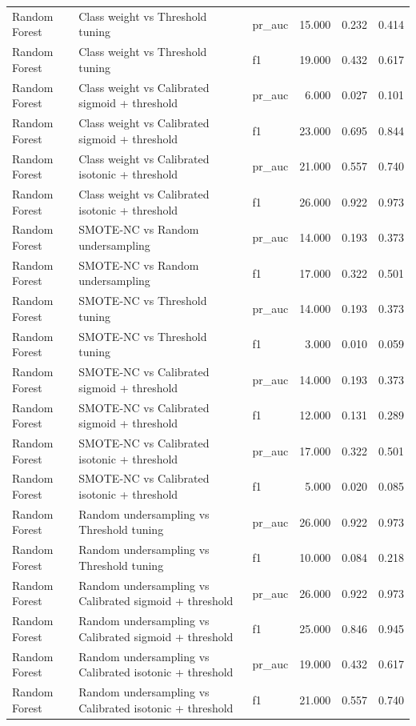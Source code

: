 \begin{tabular}{lllrrr}
Random Forest & Class weight vs Threshold tuning & pr_auc & 15.000 & 0.232 & 0.414 \\
Random Forest & Class weight vs Threshold tuning & f1 & 19.000 & 0.432 & 0.617 \\
Random Forest & Class weight vs Calibrated sigmoid + threshold & pr_auc & 6.000 & 0.027 & 0.101 \\
Random Forest & Class weight vs Calibrated sigmoid + threshold & f1 & 23.000 & 0.695 & 0.844 \\
Random Forest & Class weight vs Calibrated isotonic + threshold & pr_auc & 21.000 & 0.557 & 0.740 \\
Random Forest & Class weight vs Calibrated isotonic + threshold & f1 & 26.000 & 0.922 & 0.973 \\
Random Forest & SMOTE-NC vs Random undersampling & pr_auc & 14.000 & 0.193 & 0.373 \\
Random Forest & SMOTE-NC vs Random undersampling & f1 & 17.000 & 0.322 & 0.501 \\
Random Forest & SMOTE-NC vs Threshold tuning & pr_auc & 14.000 & 0.193 & 0.373 \\
Random Forest & SMOTE-NC vs Threshold tuning & f1 & 3.000 & 0.010 & 0.059 \\
Random Forest & SMOTE-NC vs Calibrated sigmoid + threshold & pr_auc & 14.000 & 0.193 & 0.373 \\
Random Forest & SMOTE-NC vs Calibrated sigmoid + threshold & f1 & 12.000 & 0.131 & 0.289 \\
Random Forest & SMOTE-NC vs Calibrated isotonic + threshold & pr_auc & 17.000 & 0.322 & 0.501 \\
Random Forest & SMOTE-NC vs Calibrated isotonic + threshold & f1 & 5.000 & 0.020 & 0.085 \\
Random Forest & Random undersampling vs Threshold tuning & pr_auc & 26.000 & 0.922 & 0.973 \\
Random Forest & Random undersampling vs Threshold tuning & f1 & 10.000 & 0.084 & 0.218 \\
Random Forest & Random undersampling vs Calibrated sigmoid + threshold & pr_auc & 26.000 & 0.922 & 0.973 \\
Random Forest & Random undersampling vs Calibrated sigmoid + threshold & f1 & 25.000 & 0.846 & 0.945 \\
Random Forest & Random undersampling vs Calibrated isotonic + threshold & pr_auc & 19.000 & 0.432 & 0.617 \\
Random Forest & Random undersampling vs Calibrated isotonic + threshold & f1 & 21.000 & 0.557 & 0.740 \\

\end{tabular}
